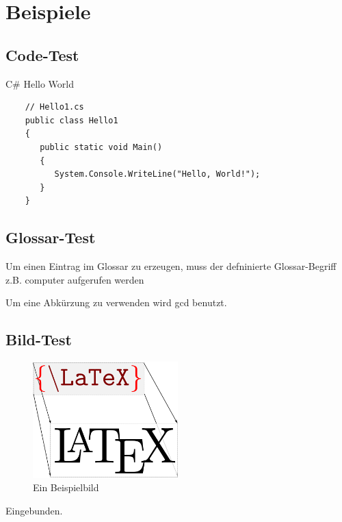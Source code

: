 \blinddocument

\chapter{Beispiele}
\section{Code-Test}
\blindtext

    \begin{listing}[]
    \caption{C\# Hello World}
    \label{listing:helloWorld}
    \begin{verbatim}
    // Hello1.cs
    public class Hello1
    {
       public static void Main()
       {
          System.Console.WriteLine("Hello, World!");
       }
    }
    \end{verbatim}
    \end{listing}

\blindtext
\newpage

\section{Glossar-Test}
Um einen Eintrag im Glossar zu erzeugen, muss der defninierte Glossar-Begriff z.B. \Gls{computer} aufgerufen werden

Um eine Abkürzung zu verwenden wird \gls{gcd} benutzt.
\newpage


\section{Bild-Test}
\blindtext

	\begin{figure}[h]
	\centering
	\includegraphics[width=0.5\textwidth]{Images/latex}
	\caption{Ein Beispielbild}%
	\label{figure:latex}%
	\end{figure}

Eingebunden.
\blindtext
\newpage

